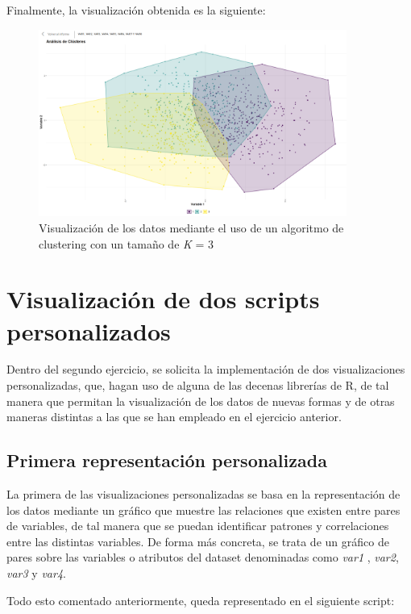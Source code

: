 \documentclass[11pt]{report}
\begin{document}
Finalmente, la visualización obtenida es la siguiente:

\begin{figure}[H]
  \centering
  \includegraphics[width=0.9\textwidth]{./img/Clusters-Image.png}
  \caption{Visualización de los datos mediante el uso de un algoritmo de clustering con un tamaño de \emph{K } = 3}
  \label{fig:clustering}
\end{figure}

\chapter{Visualización de dos scripts personalizados}

Dentro del segundo ejercicio, se solicita la implementación de dos visualizaciones personalizadas, que, hagan uso de alguna de las decenas librerías de R, de tal manera que permitan la visualización de los datos de nuevas formas y de otras maneras distintas a las que se han empleado en el ejercicio anterior.

\section{Primera representación personalizada}

La primera de las visualizaciones personalizadas se basa en la representación de los datos mediante un gráfico que muestre las relaciones que existen entre pares de variables, de tal manera que se puedan identificar patrones y correlaciones entre las distintas variables. De forma más concreta, se trata de un gráfico de pares sobre las variables o atributos del dataset denominadas como \emph{var1} , \emph{var2}, \emph{var3} y \emph{var4}.

Todo esto comentado anteriormente, queda representado en el siguiente script:
\end{document}
